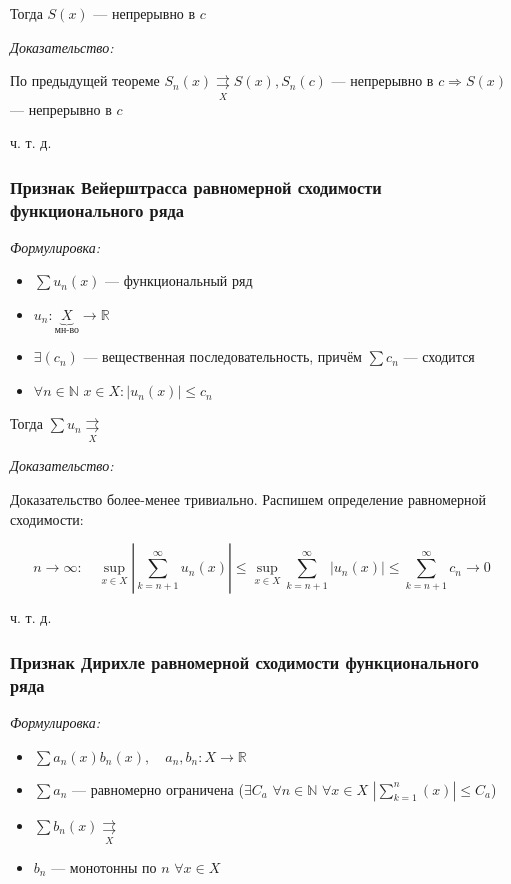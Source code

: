 \documentclass{article}
\def\dbl{\,\,}
\def\rsh#1{\underset{#1}{\rightrightarrows}}
\begin{document}
Тогда $S(x)$ --- непрерывно в $c$

\textit{Доказательство:}

По предыдущей теореме $S_n(x) \rsh{X} S(x), S_n(c)$ --- непрерывно в $c \Rightarrow S(x)$ --- непрерывно в $c$

ч. т. д.

\subsubsection{Признак Вейерштрасса равномерной сходимости функционального ряда}
\textit{Формулировка:}

\begin{itemize}
    \item $\sum u_n(x)$ --- функциональный ряд
    \item $u_n: \underbrace{X}_{\text{мн-во}} \rightarrow \mathbb{R}$
    \item $\exists (c_n)$ --- вещественная последовательность, причём $\sum c_n$ --- сходится
    \item $\forall n \in \mathbb{N} \dbl x \in X: |u_n(x)| \le c_n$
\end{itemize}

Тогда $\sum u_n \rsh{X}$

\textit{Доказательство:}

Доказательство более-менее тривиально. Распишем определение равномерной сходимости:

\[n \rightarrow \infty: \quad \sup_{x \in X} \left| \sum_{k = n + 1}^{\infty} u_n(x) \right| \le \sup_{x \in X} \sum_{k = n + 1}^{\infty} \left| u_n(x) \right| \le \sum_{k = n + 1}^{\infty} c_n \longrightarrow 0\]

ч. т. д.

\subsubsection{Признак Дирихле равномерной сходимости функционального ряда}
\textit{Формулировка:}

\begin{itemize}
    \item $\sum a_n(x) b_n(x), \quad a_n, b_n: X \rightarrow \mathbb{R}$
    \item $\sum a_n$ --- равномерно ограничена ($\exists C_a \dbl \forall n \in \mathbb{N} \dbl \forall x \in X \dbl \left|\sum_{k = 1}^{n}(x)\right| \le C_a$)
    \item $\sum b_n(x) \rsh{X}$
    \item $b_n$ --- монотонны по $n \dbl \forall x \in X$
\end{itemize}
\end{document}
